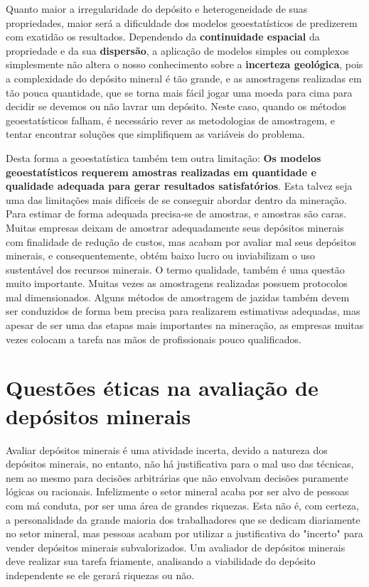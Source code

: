Quanto maior a irregularidade do depósito e heterogeneidade de suas propriedades, maior será a dificuldade dos modelos geoestatísticos de predizerem com exatidão os resultados. Dependendo da \textbf{continuidade espacial} da propriedade e da sua \textbf{dispersão}, a aplicação de modelos simples ou complexos simplesmente não altera o nosso conhecimento sobre a \textbf{incerteza geológica}, pois a complexidade do depósito mineral é tão grande, e as amostragens realizadas em tão pouca quantidade, que se torna mais fácil jogar uma moeda para cima para decidir se devemos ou não lavrar um depósito. Neste caso, quando os métodos geoestatísticos falham, é necessário rever as metodologias de amostragem, e tentar encontrar soluções que simplifiquem as variáveis do problema. 

Desta forma a geoestatística também tem outra limitação: \textbf{Os modelos geoestatísticos requerem amostras realizadas em quantidade e qualidade adequada para gerar resultados satisfatórios}. Esta talvez seja uma das limitações mais difíceis de se conseguir abordar dentro da mineração. Para estimar de forma adequada precisa-se de amostras, e amostras são caras. Muitas empresas deixam de amostrar adequadamente seus depósitos minerais com finalidade de redução de custos, mas acabam por avaliar mal seus depósitos minerais, e consequentemente, obtém baixo lucro ou inviabilizam o uso sustentável dos recursos minerais. O termo qualidade, também é uma questão muito importante. Muitas vezes as amostragens realizadas possuem protocolos mal dimensionados. Alguns métodos de amostragem de jazidas também devem ser conduzidos de forma bem precisa para realizarem estimativas adequadas, mas apesar de ser uma das etapas mais importantes na mineração, as empresas muitas vezes colocam a tarefa nas mãos de profissionais pouco qualificados. 


\section{Questões éticas na avaliação de depósitos minerais} 

Avaliar depósitos minerais é uma atividade incerta, devido a natureza dos depósitos minerais, no entanto, não há justificativa para o mal uso das técnicas, nem ao mesmo para decisões arbitrárias que não envolvam decisões puramente lógicas ou racionais. Infelizmente o setor mineral acaba por ser alvo de pessoas com má conduta, por ser uma área de grandes riquezas. Esta não é, com certeza, a personalidade da grande maioria dos trabalhadores que se dedicam diariamente no setor mineral, mas pessoas acabam por utilizar a justificativa do "incerto" para vender depósitos minerais subvalorizados. Um avaliador de depósitos minerais deve realizar sua tarefa friamente, analisando a viabilidade do depósito independente se ele gerará riquezas ou não. 

